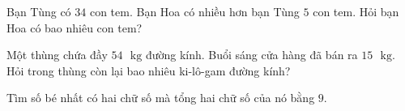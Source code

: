 \begin{bt}[1,5 điểm]
Bạn Tùng có $34$ con tem. Bạn Hoa có nhiều hơn bạn Tùng $5$ con tem. Hỏi bạn Hoa có bao nhiêu con tem?
\end{bt}

\begin{bt}[1,0 điểm]
Một thùng chứa đầy $54\text{ }\text{kg}$ đường kính. Buổi sáng cửa hàng đã bán ra $15\text{ }\text{kg}$. Hỏi trong thùng còn lại bao nhiêu ki-lô-gam đường kính?
\end{bt}

\begin{bt}[1,0 điểm]
Tìm số bé nhất có hai chữ số mà tổng hai chữ số của nó bằng $9$.
\end{bt}
